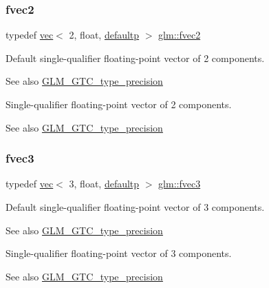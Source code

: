 \subsubsection{\texorpdfstring{fvec2}{fvec2}}
{\footnotesize\ttfamily typedef \hyperlink{structglm_1_1vec}{vec}$<$ 2, float, \hyperlink{namespaceglm_a36ed105b07c7746804d7fdc7cc90ff25a9d21ccd8b5a009ec7eb7677befc3bf51}{defaultp} $>$ \hyperlink{group__gtc__type__precision_gaabc3d7a259968a12108c052ff9265148}{glm\+::fvec2}}

Default single-\/qualifier floating-\/point vector of 2 components. \begin{DoxySeeAlso}{See also}
\hyperlink{group__gtc__type__precision}{G\+L\+M\+\_\+\+G\+T\+C\+\_\+type\+\_\+precision}
\end{DoxySeeAlso}
Single-\/qualifier floating-\/point vector of 2 components. \begin{DoxySeeAlso}{See also}
\hyperlink{group__gtc__type__precision}{G\+L\+M\+\_\+\+G\+T\+C\+\_\+type\+\_\+precision} 
\end{DoxySeeAlso}
\mbox{\label{group__gtc__type__precision_gaf7cdc93898ec0c11f1cff54bd72d022b}} 
\subsubsection{\texorpdfstring{fvec3}{fvec3}}
{\footnotesize\ttfamily typedef \hyperlink{structglm_1_1vec}{vec}$<$ 3, float, \hyperlink{namespaceglm_a36ed105b07c7746804d7fdc7cc90ff25a9d21ccd8b5a009ec7eb7677befc3bf51}{defaultp} $>$ \hyperlink{group__gtc__type__precision_gaf7cdc93898ec0c11f1cff54bd72d022b}{glm\+::fvec3}}

Default single-\/qualifier floating-\/point vector of 3 components. \begin{DoxySeeAlso}{See also}
\hyperlink{group__gtc__type__precision}{G\+L\+M\+\_\+\+G\+T\+C\+\_\+type\+\_\+precision}
\end{DoxySeeAlso}
Single-\/qualifier floating-\/point vector of 3 components. \begin{DoxySeeAlso}{See also}
\hyperlink{group__gtc__type__precision}{G\+L\+M\+\_\+\+G\+T\+C\+\_\+type\+\_\+precision} 
\end{DoxySeeAlso}
\mbox{\label{group__gtc__type__precision_ga0319cdd208269c180e326b243e2e84e4}} 
